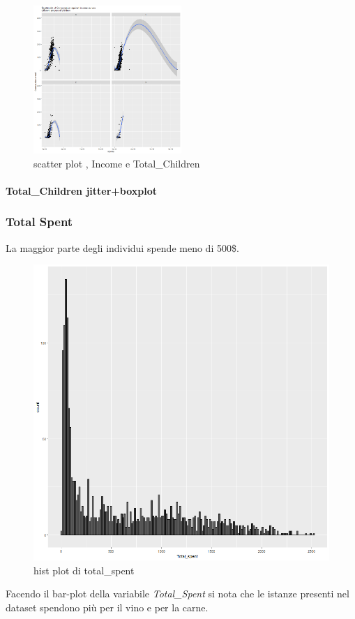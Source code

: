 \documentclass[letterpaper,11pt]{article}
\begin{document}
\begin{figure}[h!]
    \centering
    \includegraphics[width=0.5\textwidth]{Img/EDA/EDA022.png}
    \caption{scatter plot , Income e Total\_Children }
    \label{fig:fviz_eig(pca, addlabels = TRUE, ylim = c(0, 50))}
\end{figure}

\paragraph{Total\_Children jitter+boxplot}


\subsubsection{Total Spent}
La maggior parte degli individui spende meno di 500\$.

\begin{figure}[h!]
    \centering
    \includegraphics[width=.5\textwidth]{Img/EDA/EDA024.png}
    \caption{hist plot di total\_spent }
\end{figure}

Facendo il bar-plot della variabile \textit{Total\_Spent} si nota che le istanze presenti nel dataset spendono più per il vino e per la carne. 
\end{document}
